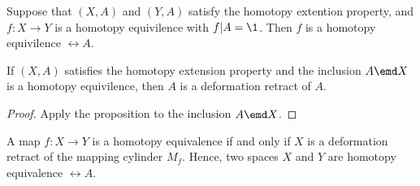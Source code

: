 \begin{nprop}
  Suppose that $(X, A)$ and $(Y, A)$ satisfy the homotopy extention property, and $f : X \to Y$ is a homotopy equivilence with $f | A = \1$. Then $f$ is a homotopy equivilence $\rel A$.
\end{nprop}

\begin{ncor}
 If $(X, A)$ satisfies the homotopy extension property and the inclusion $A \emd X$ is a homotopy equivilence, then $A$ is a deformation retract of $A$.
\end{ncor}

\begin{proof}
  Apply the proposition to the inclusion $A \emd X$.
\end{proof}

\begin{ncor}
 A map $f : X \to Y$ is a homotopy equivalence if and only if $X$ is a deformation retract of the mapping cylinder $M_f$. Hence, two spaces $X$ and $Y$ are homotopy equivalence $\rel A$.
\end{ncor}
